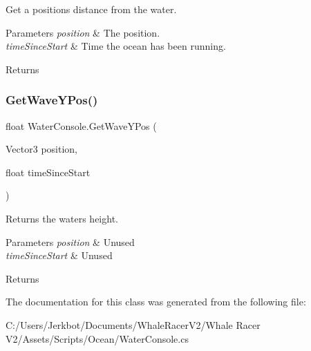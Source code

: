 Get a position\textquotesingle{}s distance from the water. 


\begin{DoxyParams}{Parameters}
{\em position} & The position.\\
\hline
{\em time\+Since\+Start} & Time the ocean has been running.\\
\hline
\end{DoxyParams}
\begin{DoxyReturn}{Returns}

\end{DoxyReturn}
\mbox{\label{class_water_console_aab7b61cf764417ae88f2ad3aac5f33ca}} 
\subsubsection{\texorpdfstring{Get\+Wave\+Y\+Pos()}{GetWaveYPos()}}
{\footnotesize\ttfamily float Water\+Console.\+Get\+Wave\+Y\+Pos (\begin{DoxyParamCaption}\item[{Vector3}]{position,  }\item[{float}]{time\+Since\+Start }\end{DoxyParamCaption})}



Returns the water\textquotesingle{}s height. 


\begin{DoxyParams}{Parameters}
{\em position} & Unused\\
\hline
{\em time\+Since\+Start} & Unused\\
\hline
\end{DoxyParams}
\begin{DoxyReturn}{Returns}

\end{DoxyReturn}


The documentation for this class was generated from the following file\+:\begin{DoxyCompactItemize}
\item 
C\+:/\+Users/\+Jerkbot/\+Documents/\+Whale\+Racer\+V2/\+Whale Racer V2/\+Assets/\+Scripts/\+Ocean/Water\+Console.\+cs\end{DoxyCompactItemize}
